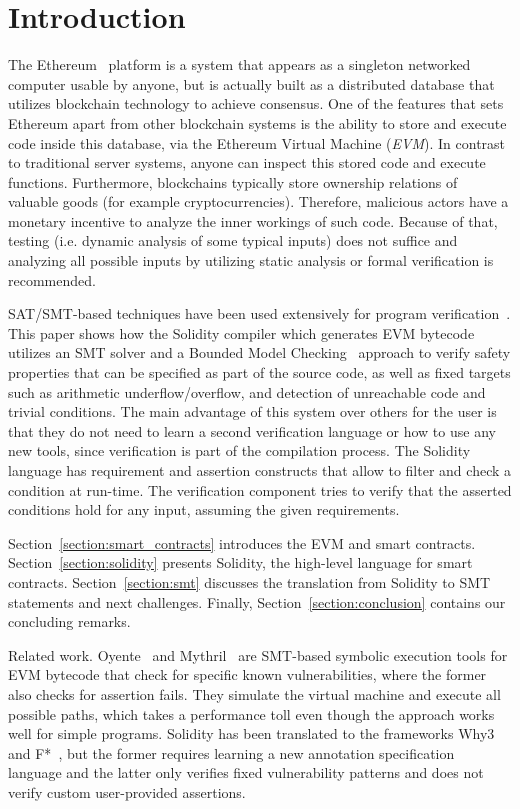 \section{Introduction}
The Ethereum~\cite{YellowPaper} platform is a system that appears as a
singleton networked computer usable by anyone, but is actually built as a
distributed database that utilizes blockchain technology to achieve consensus.
%
One of the features that sets Ethereum apart from other blockchain systems is
the ability to store and execute code inside this database, via the Ethereum
Virtual Machine (\emph{EVM}).
%
In contrast to traditional server systems, anyone can inspect this stored code
and execute functions.
%
Furthermore, blockchains typically store ownership relations of valuable goods
(for example
cryptocurrencies).
%
Therefore, malicious actors have a monetary incentive to analyze the inner
workings of such code. Because of that, testing (i.e.  dynamic analysis of some
typical inputs) does not suffice and analyzing all possible inputs by utilizing
static analysis or formal verification is recommended.

SAT/SMT-based techniques have been used extensively for program 
verification~\cite{Biere99,Donaldson11,Komuravelli13,Beyer11,Kroening14,Alt17}.
%
This paper shows how the Solidity compiler which generates EVM bytecode
utilizes an SMT solver and a Bounded Model Checking~\cite{Biere99} approach to
verify safety properties that can be specified as part of the source code, as
well as fixed targets such as arithmetic underflow/overflow, and detection of
unreachable code and trivial conditions.
%
The main advantage of this system over others for the user is that they do not
need to learn a second verification language or how to use any new tools, since
verification is part of the compilation process.
%
The Solidity language has requirement and assertion constructs that allow to
filter and check a condition at run-time.  The verification component tries to
verify that the asserted conditions hold for any input, assuming the given
requirements.

Section~\ref{section:smart_contracts} introduces the EVM and smart contracts.
Section~\ref{section:solidity} presents Solidity, the high-level language for smart
contracts. Section~\ref{section:smt} discusses the translation from Solidity to SMT
statements and next challenges. Finally, Section~\ref{section:conclusion}
contains our concluding remarks.

\begin{paragraph}{Related work.}
Oyente~\cite{Luu2016} and Mythril~\cite{Mythril} are SMT-based symbolic
execution tools for EVM bytecode that check for specific known vulnerabilities,
where the former also checks for assertion fails. They simulate the virtual
machine and execute all possible paths, which takes a performance toll even
though the approach works well for simple programs.
%
Solidity has been translated to the frameworks Why3~\cite{Why3} and
F*~\cite{Bhargavan2016}, but the former requires learning a new annotation
specification language and the latter only verifies fixed vulnerability
patterns and does not verify custom user-provided assertions.

\end{paragraph}
